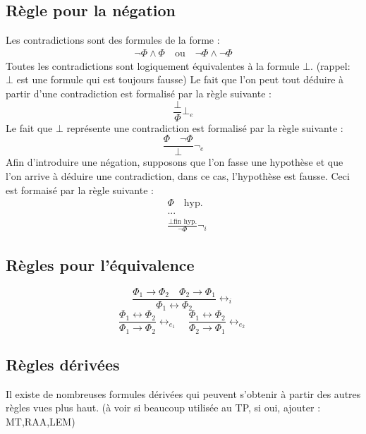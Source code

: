 \subsection{Règle pour la négation}
Les contradictions sont des formules de la forme : 
\begin{align*}
    \neg\Phi\land\Phi\quad \text{ou}\quad \neg\Phi\land\neg\Phi
\end{align*}
Toutes les contradictions sont logiquement équivalentes à la formule $\bot$. (rappel: $\bot$ est une formule qui est toujours fausse) \newline
Le fait que l'on peut tout déduire à partir d'une contradiction est formalisé par la règle suivante :
\begin{equation*}
\frac{\bot}{\Phi}\bot_e
\end{equation*}
Le fait que $\bot$ représente une contradiction est formalisé par la règle suivante :
\begin{equation*}
\frac{\Phi\quad\neg\Phi}{\bot}\neg_e
\end{equation*}
Afin d'introduire une négation, supposons que l'on fasse une hypothèse et que l'on arrive à déduire une contradiction, dans ce cas, l'hypothèse est fausse. Ceci est formaisé par la règle suivante :
\begin{align*}
    &\Phi \quad \text{hyp.}\\
    &...\\
    &\frac{\bot\text{fin hyp.}}{\neg\Phi}\neg_i
\end{align*}


\subsection{Règles pour l'équivalence}
\begin{equation*}
    \frac{\Phi_1\rightarrow\Phi_2\quad\Phi_2\rightarrow\Phi_1}{\Phi_1\leftrightarrow\Phi_2}\leftrightarrow_i
\end{equation*}
\begin{equation*}
    \frac{\Phi_1\leftrightarrow\Phi_2}{\Phi_1\rightarrow\Phi_2}\leftrightarrow_{e_1}\quad\frac{\Phi_1\leftrightarrow\Phi_2}{\Phi_2\rightarrow\Phi_1}\leftrightarrow_{e_2}
\end{equation*}

\subsection{Règles dérivées}
Il existe de nombreuses formules dérivées qui peuvent s'obtenir à partir des autres règles vues plus haut. (à voir si beaucoup utilisée au TP, si oui, ajouter : MT,RAA,LEM)


